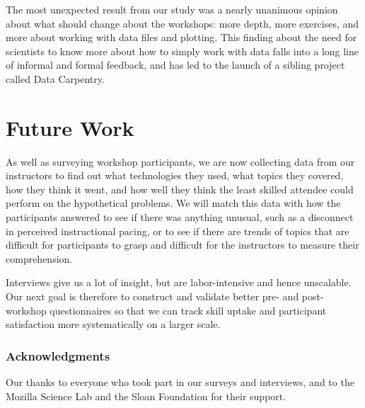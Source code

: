 \documentclass[10pt, twocolumn]{article}
\begin{document}
The most unexpected result from our study was a nearly unanimous opinion about what should change about the workshops:
more depth,
more exercises,
and more about working with data files and plotting.
This finding about the need for scientists to know more about how to simply work with data
falls into a long line of informal and formal feedback,
and has led to the launch of a sibling project called Data Carpentry.

\section{Future Work}

As well as surveying workshop participants,
we are now collecting data from our instructors
to find out what technologies they used,
what topics they covered,
how they think it went,
and how well they think the least skilled attendee could perform on the hypothetical problems.
We will match this data with how the participants answered to see if there was anything unusual,
such as a disconnect in perceived instructional pacing,
or to see if there are trends of topics that are difficult for participants to grasp
and difficult for the instructors to measure their comprehension.

Interviews give us a lot of insight,
but are labor-intensive and hence unscalable.
Our next goal is therefore to construct and validate better pre- and post-workshop questionnaires
so that we can track skill uptake and participant satisfaction
more systematically on a larger scale.

\subsubsection*{Acknowledgments}

Our thanks to everyone who took part in our surveys and interviews,
and to the Mozilla Science Lab and the Sloan Foundation for their support.

{\small
    
    
}
\end{document}
